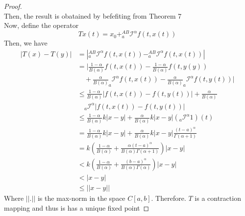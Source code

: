 \documentclass[twoside]{book}
\begin{document}
{\begin{proof}
\begin{equation}
    \end{equation}
    Then, the result is obatained by befefiting from Theorem 7\\
    Now, define the operator
    $$T x(t) = x_0 + ^{AB}_{a} \mathscr{I}^{\alpha} f(t,x(t))$$
    Then, we have
    \begin{align*}
        |T(x) - T(y)| & = |^{AB}_{a} \mathscr{I}^{\alpha}f(t,x(t)) -^{AB}_{a}\mathscr{I}^{\alpha} f(t,x(t))|                                              \\
                      & = |\frac{1-\alpha}{B(\alpha)}f(t,x(t))- \frac{1-\alpha}{B(\alpha)}f(t,y(y))                                                       \\
                      & \quad + \frac{\alpha}{B(\alpha)}_{a}\mathscr{I}^{\alpha}f(t,x(t)) - \frac{\alpha}{B(\alpha)} _{a}\mathscr{I}^{\alpha} f(t,y(t)) | \\
                      & \leq \frac{1-\alpha}{B(\alpha)}|f(t,x(t))-f(t,y(t))|+ \frac{\alpha}{B(\alpha)}                                                    \\
                      & \quad _{a}\mathscr{I}^{\alpha}|f(t,x(t))-f(t,y(t))|                                                                               \\
                      & \leq \frac{1-\alpha}{B(\alpha)} k|x-y| + \frac{\alpha}{B(\alpha)}k|x-y| (_{a}\mathscr{I}^{\alpha}1)(t)                            \\
                      & = \frac{1-\alpha}{B(\alpha)}k|x-y| + \frac{\alpha}{B(\alpha)}k|x-y| \frac{(t-a)^\alpha}{\Gamma{(\alpha+1)}}                       \\
                      & = k \left( \frac{1-\alpha}{B(\alpha)} + \frac{\alpha (t-a)^{\alpha}}{B(\alpha)\Gamma{(\alpha +1)}}\right) |x-y|                   \\
                      & < k \left( \frac{1-\alpha}{B(\alpha)} + \frac{(b-a)^{\alpha}}{B(\alpha)\Gamma{(\alpha)}}\right) |x-y|                             \\
                      & < |x-y|                                                                                                                           \\
                      & \leq ||x-y||
    \end{align*}
    Where $||.||$ is the max-norm in the space $C[a,b]$. Therefore. $T$ is a contraction mapping and thus is has a unique fixed point
\end{proof}
}
\end{document}
